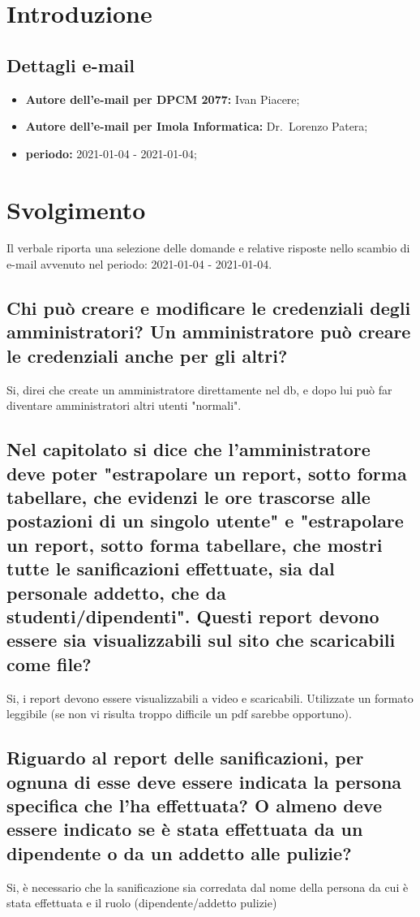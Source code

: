 \section*{Introduzione}
\subsection*{Dettagli e-mail}
\begin{itemize}
	\item \textbf{Autore dell'e-mail per DPCM 2077:} Ivan Piacere;
	\item \textbf{Autore dell'e-mail per Imola Informatica:} Dr.~Lorenzo Patera;
	\item \textbf{periodo:} 2021-01-04 - 2021-01-04;
\end{itemize}

\section*{Svolgimento}
Il verbale riporta una selezione delle domande e relative risposte nello scambio di e-mail avvenuto nel periodo: 2021-01-04 - 2021-01-04.
\subsection*{Chi può creare e modificare le credenziali degli amministratori? Un amministratore può creare le credenziali anche per gli altri?}
Si, direi che create un amministratore direttamente nel db, e dopo lui può far diventare amministratori altri utenti "normali".
\subsection*{Nel capitolato si dice che l'amministratore deve poter "estrapolare un report, sotto forma tabellare, che evidenzi le ore trascorse alle postazioni di un singolo utente" e "estrapolare un report, sotto forma tabellare, che mostri tutte le sanificazioni effettuate, sia dal personale addetto, che da studenti/dipendenti". Questi report devono essere sia visualizzabili sul sito che scaricabili come file?}
Si, i report devono essere visualizzabili a video e scaricabili. Utilizzate un formato leggibile (se non vi risulta troppo difficile un pdf sarebbe opportuno).
\subsection*{Riguardo al report delle sanificazioni, per ognuna di esse deve essere indicata la persona specifica che l'ha effettuata? O almeno deve essere indicato se è stata effettuata da un dipendente o da un addetto alle pulizie?}
Si, è necessario che la sanificazione sia corredata dal nome della persona da cui è stata effettuata e il ruolo (dipendente/addetto pulizie)
